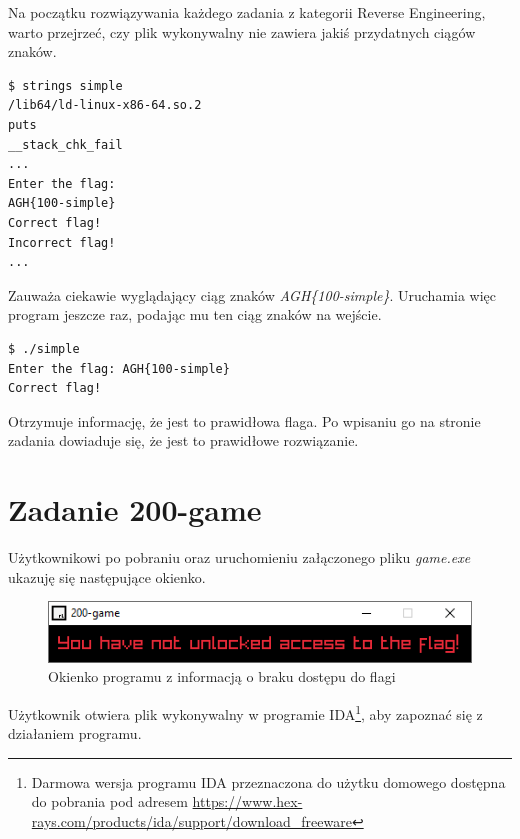 \documentclass[language=polish,type=eng]{aghmodern}
\begin{document}
Na początku rozwiązywania każdego zadania z kategorii Reverse Engineering, warto
przejrzeć, czy plik wykonywalny nie zawiera jakiś przydatnych ciągów znaków.

\begin{verbatim}
$ strings simple
/lib64/ld-linux-x86-64.so.2
puts
__stack_chk_fail
...
Enter the flag: 
AGH{100-simple}
Correct flag!
Incorrect flag!
...
\end{verbatim}

Zauważa ciekawie wyglądający ciąg znaków \emph{AGH\{100-simple\}}.
Uruchamia więc program jeszcze raz, podając mu ten ciąg znaków na wejście.

\begin{verbatim}
$ ./simple
Enter the flag: AGH{100-simple}
Correct flag!
\end{verbatim}

Otrzymuje informację, że jest to prawidłowa flaga.
Po wpisaniu go na stronie zadania dowiaduje się, że jest to prawidłowe rozwiązanie.

\section{Zadanie 200-game}

Użytkownikowi po pobraniu oraz uruchomieniu załączonego pliku \emph{game.exe} ukazuję
się następujące okienko.

\begin{figure}[H]
\centering
\includegraphics{200_not_unlocked}
\caption{Okienko programu z informacją o braku dostępu do flagi}
\end{figure}

Użytkownik otwiera plik wykonywalny w programie IDA\footnote{
Darmowa wersja programu IDA przeznaczona do użytku domowego dostępna do pobrania pod adresem 
\url{https://www.hex-rays.com/products/ida/support/download_freeware}},
aby zapoznać się z działaniem programu.
\end{document}
